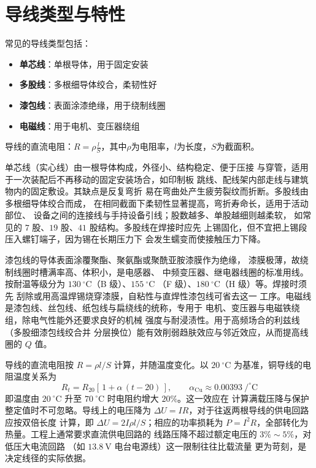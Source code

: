 \section{导线类型与特性}
\label{sec:wire_types}

常见的导线类型包括：

\begin{itemize}
    \item \textbf{单芯线}：单根导体，用于固定安装
    \item \textbf{多股线}：多根细导体绞合，柔韧性好
    \item \textbf{漆包线}：表面涂漆绝缘，用于绕制线圈
    \item \textbf{电磁线}：用于电机、变压器绕组
\end{itemize}

导线的直流电阻：$R = \rho\frac{l}{S}$，其中$\rho$为电阻率，$l$为长度，$S$为截面积。

单芯线（实心线）由一根导体构成，外径小、结构稳定、便于压接
与穿管，适用于一次装配后不再移动的固定安装场合，如印制板
跳线、配线架内部走线与建筑物内的固定敷设。其缺点是反复弯折
易在弯曲处产生疲劳裂纹而折断。多股线由多根细导体绞合而成，
在相同截面下柔韧性显著提高，弯折寿命长，适用于活动部位、
设备之间的连接线与手持设备引线；股数越多、单股越细则越柔软，
如常见的 $7$ 股、$19$ 股、$41$ 股结构。多股线在焊接时应先
上锡固化，但不宜把上锡段压入螺钉端子，因为锡在长期压力下
会发生蠕变而使接触压力下降。

漆包线的导体表面涂覆聚酯、聚氨酯或聚酰亚胺漆膜作为绝缘，
漆膜极薄，故绕制线圈时槽满率高、体积小，是电感器、
中频变压器、继电器线圈的标准用线。按耐温等级分为
$130\ ^{\circ}\mathrm{C}$（B 级）、$155\ ^{\circ}\mathrm{C}$
（F 级）、$180\ ^{\circ}\mathrm{C}$（H 级）等。焊接时须先
刮除或用高温焊锡烧穿漆膜，自粘性与直焊性漆包线可省去这一
工序。电磁线是漆包线、丝包线、纸包线与扁绕线的统称，专用于
电机、变压器与电磁铁绕组，除电气性能外还要求良好的机械
强度与耐浸渍性。用于高频场合的利兹线（多股细漆包线绞合并
分层换位）能有效削弱趋肤效应与邻近效应，从而提高线圈的
$Q$ 值。

导线的直流电阻按 $R = \rho l/S$ 计算，并随温度变化。以
$20\ ^{\circ}\mathrm{C}$ 为基准，铜导线的电阻温度关系为
\begin{equation}
R_t = R_{20}\left[\,1 + \alpha\,(t - 20)\,\right], \qquad
\alpha_{\mathrm{Cu}} \approx 0.00393\ /^{\circ}\mathrm{C}
\end{equation}
即温度由 $20\ ^{\circ}\mathrm{C}$ 升至
$70\ ^{\circ}\mathrm{C}$ 时电阻约增大 $20\%$。这一效应在
计算满载压降与保护整定值时不可忽略。导线上的电压降为
$\Delta U = I R$，对于往返两根导线的供电回路应按双倍长度
计算，即 $\Delta U = 2 I \rho l / S$；相应的功率损耗为
$P = I^2 R$，全部转化为热量。工程上通常要求直流供电回路的
线路压降不超过额定电压的 $3\%\sim5\%$，对低压大电流回路
（如 $13.8\ \mathrm{V}$ 电台电源线）这一限制往往比载流量
更为苛刻，是决定线径的实际依据。

